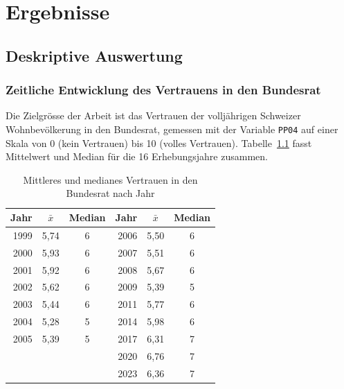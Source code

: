 

\chapter{Ergebnisse}
\label{Chapter3}


\section{Deskriptive Auswertung}
\label{sec:deskriptiv}

\subsection{Zeitliche Entwicklung des Vertrauens in den Bundesrat}
\label{subsec:zeitlich}

Die Zielgrösse der Arbeit ist das Vertrauen der volljährigen Schweizer
Wohnbevölkerung in den Bundesrat, gemessen mit der Variable \texttt{PP04} auf einer
Skala von 0 (kein Vertrauen) bis 10 (volles Vertrauen). Tabelle~\ref{tab:vertrauen_jahr}
fasst Mittelwert und Median für die 16 Erhebungsjahre zusammen.

\begin{table}[h]
\centering
\caption{Mittleres und medianes Vertrauen in den Bundesrat nach Jahr}
\label{tab:vertrauen_jahr}
\begin{tabular}{rcc@{\hspace{2em}}rcc}
\toprule
Jahr & $\bar{x}$ & Median & Jahr & $\bar{x}$ & Median \\
\midrule
1999 & 5{,}74 & 6 & 2006 & 5{,}50 & 6 \\
2000 & 5{,}93 & 6 & 2007 & 5{,}51 & 6 \\
2001 & 5{,}92 & 6 & 2008 & 5{,}67 & 6 \\
2002 & 5{,}62 & 6 & 2009 & 5{,}39 & 5 \\
2003 & 5{,}44 & 6 & 2011 & 5{,}77 & 6 \\
2004 & 5{,}28 & 5 & 2014 & 5{,}98 & 6 \\
2005 & 5{,}39 & 5 & 2017 & 6{,}31 & 7 \\
     &        &   & 2020 & 6{,}76 & 7 \\
     &        &   & 2023 & 6{,}36 & 7 \\
\bottomrule
\end{tabular}
\end{table}

